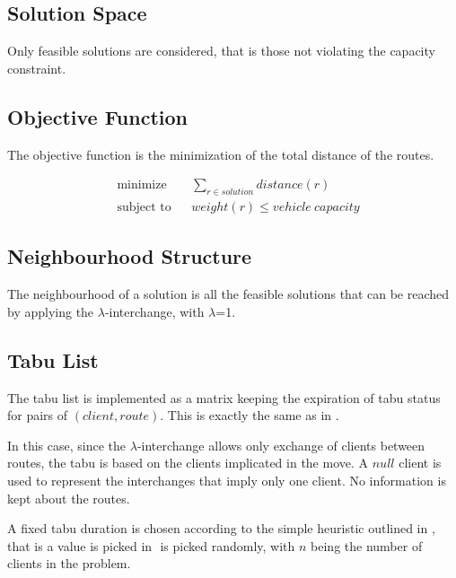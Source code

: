 \documentclass{article} %
\begin{document}
\subsection{Solution Space}

Only feasible solutions are considered, that is those not violating the capacity constraint.


\subsection{Objective Function}

The objective function is the minimization of the total distance of the routes.

\begin{equation*}
\begin{aligned}
& \text{minimize}
& & \sum\limits_{r \in solution} distance(r) \\
& \text{subject to}
& & weight(r) \leq vehicle\ capacity
\end{aligned}
\end{equation*}


\subsection{Neighbourhood Structure}

The neighbourhood of a solution is all the feasible solutions that can be reached by applying the $\lambda$-interchange, with $\lambda$=1.


\subsection{Tabu List}

The tabu list is implemented as a matrix keeping the expiration of tabu status for pairs of $(client, route)$. This is exactly the same as in \citep{osman1993}.

In this case, since the $\lambda$-interchange allows only exchange of clients between routes, the tabu is based on the clients implicated in the move. A $null$ client is used to represent the interchanges that imply only one client. No information is kept about the routes.\newline

A fixed tabu duration is chosen according to the simple heuristic outlined in \citep{osman1993}, that is a value is picked in \begin{math} [0.4n,\ 0.6n] \end{math} is picked randomly, with $n$ being the number of clients in the problem. 
\end{document}
